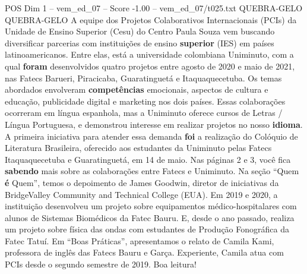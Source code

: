 \begin{textsample}{POS Dim 1 – vem\_ed\_07 – Score -1.00 – vem\_ed\_07/t025.txt}  \label{ex:f1_pos_186}
QUEBRA-GELO QUEBRA-GELO A equipe dos Projetos Colaborativos Internacionais (PCIs) da Unidade de Ensino Superior (Cesu) do Centro Paula Souza vem buscando diversificar parcerias com instituições de ensino \textbf{superior} (IES) em países latinoamericanos.
Entre elas, está a universidade colombiana Uniminuto, com a qual \textbf{foram} desenvolvidos quatro projetos entre agosto de 2020 e maio de 2021, nas Fatecs Barueri, Piracicaba, Guaratinguetá e Itaquaquecetuba.
Os temas abordados envolveram \textbf{competências} emocionais, aspectos de cultura e educação, publicidade digital e marketing nos dois países.
Essas colaborações ocorreram em língua espanhola, mas a Uniminuto oferece cursos de Letras / Língua Portuguesa, e demonstrou interesse em realizar projetos no nosso \textbf{idioma}.
A primeira iniciativa para atender essa demanda \textbf{foi} a realização do Colóquio de Literatura Brasileira, oferecido aos estudantes da Uniminuto pelas Fatecs Itaquaquecetuba e Guaratinguetá, em 14 de maio.
Nas páginas 2 e 3, você fica \textbf{sabendo} mais sobre as colaborações entre Fatecs e Uniminuto.
Na seção “Quem \textbf{é} Quem”, temos o depoimento de James Goodwin, diretor de iniciativas da BridgeValley Community and Technical College (EUA).
Em 2019 e 2020, a instituição desenvolveu um projeto sobre equipamentos médico-hospitalares com alunos de Sistemas Biomédicos da Fatec Bauru.
E, desde o ano passado, realiza um projeto sobre física das ondas com estudantes de Produção Fonográfica da Fatec Tatuí.
Em “Boas Práticas”, apresentamos o relato de Camila Kami, professora de inglês das Fatecs Bauru e Garça.
Experiente, Camila atua com PCIs desde o segundo semestre de 2019.
Boa leitura!

\end{textsample}
